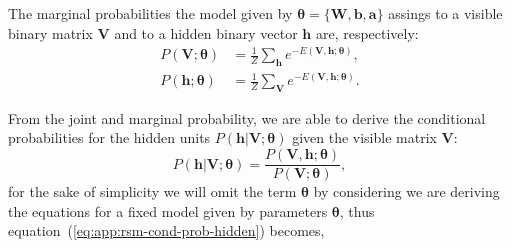 The marginal probabilities the model given by $\bm{\theta} = \{\mathbf{W}, \mathbf{b}, \mathbf{a}\}$ assings to a visible binary matrix $\mathbf{V}$ and to a hidden binary vector $\mathbf{h}$ are, respectively:
\begin{align}
    \label{eq:app:rsm-marg-prob-visible}
    P(\mathbf{V}; \bm{\theta}) &= \frac{1}{Z} \sum_{\mathbf{h}} e^{-E(\mathbf{V}, \mathbf{h}; \bm{\theta})}, \\
    \label{eq:app:rsm-marg-prob-hidden}
    P(\mathbf{h}; \bm{\theta}) &= \frac{1}{Z} \sum_{\mathbf{V}} e^{-E(\mathbf{V}, \mathbf{h}; \bm{\theta})}.
\end{align}

From the joint and marginal probability, we are able to derive the conditional probabilities for the hidden units $P(\mathbf{h} | \mathbf{V}; \bm{\theta})$ given the visible matrix $\mathbf{V}$:
\begin{equation}
    \label{eq:app:rsm-cond-prob-hidden}
    P(\mathbf{h} | \mathbf{V}; \bm{\theta}) = \frac{P(\mathbf{V}, \mathbf{h}; \bm{\theta})}{P(\mathbf{V}; \bm{\theta})},
\end{equation}
for the sake of simplicity we will omit the term $\bm{\theta}$ by considering we are deriving the equations for a fixed model given by parameters $\bm{\theta}$, thus equation~(\ref{eq:app:rsm-cond-prob-hidden}) becomes,
